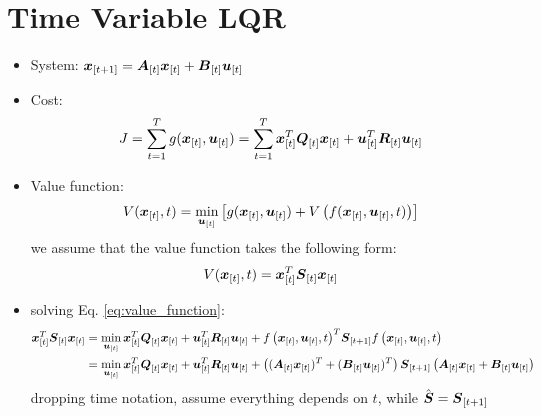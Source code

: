 \documentclass{article}
\begin{document}



\section{Time Variable LQR}
\newcommand{\vxt}{\vx_{[t]}}
\newcommand{\vut}{\vu_{[t]}}
\newcommand{\vSt}{\vS_{[t]}}
\newcommand{\vSp}{\vS_{[t+1]}}
\newcommand{\vQt}{\vQ_{[t]}}
\newcommand{\vRt}{\vR_{[t]}}
\newcommand{\vAt}{\vA_{[t]}}
\newcommand{\vBt}{\vB_{[t]}}

\begin{itemize}
  \item System: ${\boldsymbol{x}}_{[t+1]} = {\boldsymbol{A}}_{[t]} {\boldsymbol{x}}_{[t]} + {\boldsymbol{B}}_{[t]} {\boldsymbol{u}}_{[t]}$
  \item Cost:
    \begin{align*}
      J = \sum_{t=1}^T g({\boldsymbol{x}}_{[t]}, {\boldsymbol{u}}_{[t]})
        = \sum_{t=1}^T {\boldsymbol{x}}_{[t]}^T {\boldsymbol{Q}}_{[t]} {\boldsymbol{x}}_{[t]} + {\boldsymbol{u}}_{[t]}^T {\boldsymbol{R}}_{[t]} {\boldsymbol{u}}_{[t]}
    \end{align*}
  \item Value function:
    \begin{align}
      V({\boldsymbol{x}}_{[t]}, t) = \min_{{\boldsymbol{u}}_{[t]}}{\left[ 
          g({\boldsymbol{x}}_{[t]}, {\boldsymbol{u}}_{[t]})
          + { V \left( f({\boldsymbol{x}}_{[t]}, {\boldsymbol{u}}_{[t]}, t)  \right) }  \right]} \label{eq:value_function}
    \end{align}
    we assume that the value function takes the following form:
    \begin{align*}
        V({\boldsymbol{x}}_{[t]}, t) = {\boldsymbol{x}}_{[t]}^T {\boldsymbol{S}}_{[t]} {\boldsymbol{x}}_{[t]}
    \end{align*}
  \item solving Eq. \ref{eq:value_function}:
    \begin{align}
      \vxt^T \vSt \vxt &= \min_{\vut} \vxt^T \vQt \vxt + \vut^T \vRt \vut
          + \func{f}{\vxt, \vut, t}^T \vSp \func{f}{\vxt, \vut, t}
          \label{eq:value_expanded} \\
          &= \min_{\vut} \vxt^T \vQt \vxt + \vut^T \vRt \vut
          + \group{(\vAt \vxt)^T + (\vBt \vut)^T} \vSp \group{\vAt \vxt + \vBt \vut}
           \nonumber
    \end{align}
    dropping time notation, assume everything depends on $t$, while
      $\hat{\vS} = \vSp$

      \renewcommand{\vxt}{\vx}
      \renewcommand{\vut}{\vu}
      \renewcommand{\vSt}{\vS}
      \renewcommand{\vSp}{\hat{\vS}}
      \renewcommand{\vQt}{\vQ}
      \renewcommand{\vRt}{\vR}
      \renewcommand{\vAt}{\vA}
      \renewcommand{\vBt}{\vB}


\end{itemize}
\end{document}
